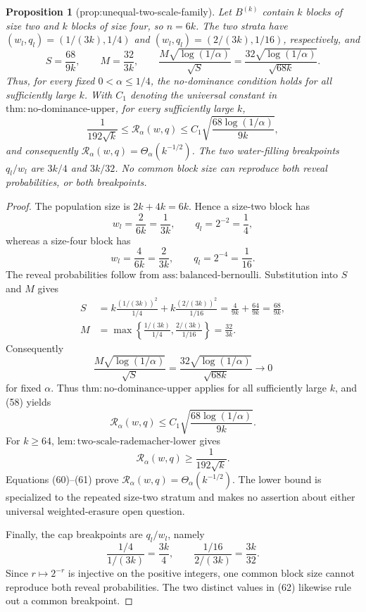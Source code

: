 \documentclass{article}
\newtheorem{proposition}{Proposition}
\begin{document}
\begin{proposition}[prop:unequal-two-scale-family]\label{prop:unequal-two-scale-family}
Let \(B^{(k)}\) contain \(k\) blocks of size two and \(k\) blocks of size four, so \(n=6k\). The two strata have \((w_l,q_l)=(1/(3k),1/4)\) and \((w_l,q_l)=(2/(3k),1/16)\), respectively, and
\[
 S=\frac{68}{9k},\qquad M=\frac{32}{3k},\qquad
 \frac{M\sqrt{\log(1/\alpha)}}{\sqrt S}
 =\frac{32\sqrt{\log(1/\alpha)}}{\sqrt{68k}}.
\]
Thus, for every fixed \(0<\alpha\le1/4\), the no-dominance condition holds for all sufficiently large \(k\). With \(C_1\) denoting the universal constant in \(\mathrm{thm{:}no\text{-}dominance\text{-}upper}\), for every sufficiently large \(k\),
\[
 \frac{1}{192\sqrt{k}}
 \le \mathcal R_\alpha(w,q)
 \le C_1\sqrt{\frac{68\log(1/\alpha)}{9k}},
\]
and consequently \(\mathcal R_\alpha(w,q)=\Theta_\alpha(k^{-1/2})\). The two water-filling breakpoints \(q_l/w_l\) are \(3k/4\) and \(3k/32\). No common block size can reproduce both reveal probabilities, or both breakpoints.
\end{proposition}
\begin{proof}
The population size is \(2k+4k=6k\). Hence a size-two block has
\[
 w_l=\frac2{6k}=\frac1{3k},\qquad q_l=2^{-2}=\frac14,
\]
whereas a size-four block has
\[
 w_l=\frac4{6k}=\frac2{3k},\qquad q_l=2^{-4}=\frac1{16}.
\]
The reveal probabilities follow from \(\mathrm{ass{:}balanced\text{-}bernoulli}\). Substitution into \(S\) and \(M\) gives
\[
\begin{aligned}
 S
 &=k\frac{(1/(3k))^2}{1/4}
   +k\frac{(2/(3k))^2}{1/16}
   =\frac4{9k}+\frac{64}{9k}
   =\frac{68}{9k},\\
 M
 &=\max\left\{\frac{1/(3k)}{1/4},
                \frac{2/(3k)}{1/16}\right\}
   =\frac{32}{3k}.
\end{aligned}
\tag{58}
\]
Consequently
\[
 \frac{M\sqrt{\log(1/\alpha)}}{\sqrt S}
 =\frac{32\sqrt{\log(1/\alpha)}}{\sqrt{68k}}
 \longrightarrow0
\tag{59}
\]
for fixed \(\alpha\). Thus \(\mathrm{thm{:}no\text{-}dominance\text{-}upper}\) applies for all sufficiently large \(k\), and (58) yields
\[
 \mathcal R_\alpha(w,q)
 \le C_1\sqrt{\frac{68\log(1/\alpha)}{9k}}.
\tag{60}
\]
For \(k\ge64\), \(\mathrm{lem{:}two\text{-}scale\text{-}rademacher\text{-}lower}\) gives
\[
 \mathcal R_\alpha(w,q)\ge\frac1{192\sqrt{k}}.
\tag{61}
\]
Equations (60)--(61) prove \(\mathcal R_\alpha(w,q)=\Theta_\alpha(k^{-1/2})\). The lower bound is specialized to the repeated size-two stratum and makes no assertion about either universal weighted-erasure open question.

Finally, the cap breakpoints are \(q_l/w_l\), namely
\[
 \frac{1/4}{1/(3k)}=\frac{3k}{4},
 \qquad
 \frac{1/16}{2/(3k)}=\frac{3k}{32}.
\tag{62}
\]
Since \(r\mapsto2^{-r}\) is injective on the positive integers, one common block size cannot reproduce both reveal probabilities. The two distinct values in (62) likewise rule out a common breakpoint.
\end{proof}
\end{document}
